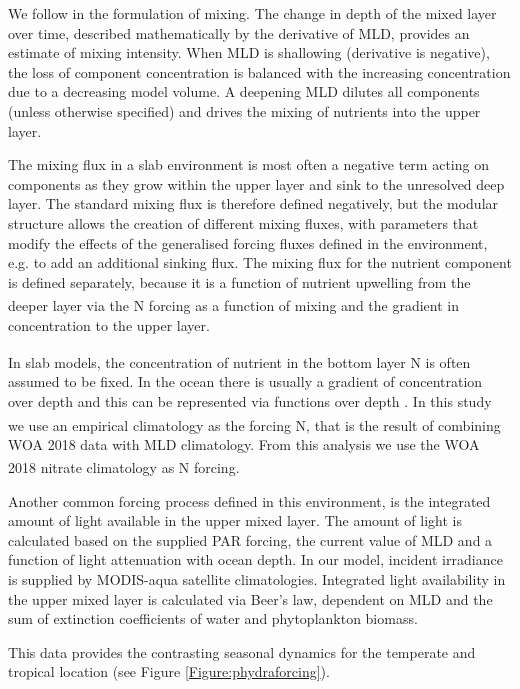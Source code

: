 \documentclass[journal abbreviations, manuscript]{copernicus}
\begin{document}
We follow \citet{Evans1985ACycles} in the formulation of mixing. The change in depth of the mixed layer over time, described mathematically by the derivative of MLD, provides an estimate of mixing intensity. When MLD is shallowing (derivative is negative), the loss of component concentration is balanced with the increasing concentration due to a decreasing model volume. A deepening MLD dilutes all components (unless otherwise specified) and drives the mixing of nutrients into the upper layer.

The mixing flux in a slab environment is most often a negative term acting on components as they grow within the upper layer and sink to the unresolved deep layer. The standard mixing flux is therefore defined negatively, but the modular structure allows the creation of different mixing fluxes, with parameters that modify the effects of the generalised forcing fluxes defined in the environment, e.g. to add an additional sinking flux. The mixing flux for the nutrient component is defined separately, because it is a function of nutrient upwelling from the deeper layer via the \unit{N^\emptyset} forcing as a function of mixing and the gradient in concentration to the upper layer.

In slab models, the concentration of nutrient in the bottom layer \unit{N^\emptyset} is often assumed to be fixed. In the ocean there is usually a gradient of concentration over depth and this can be represented via functions over depth \citep{Frost1987GrazingSpp., Fasham1995VariationsAnalysis}. In this study we use an empirical climatology as the forcing \unit{N^\emptyset}, that is the result of combining WOA 2018 data with MLD climatology. From this analysis we use the WOA 2018 nitrate climatology as \unit{N^\emptyset} forcing.

Another common forcing process defined in this environment, is the integrated amount of light available in the upper mixed layer. The amount of light is calculated based on the supplied PAR forcing, the current value of MLD and a function of light attenuation with ocean depth. In our model, incident irradiance is supplied by MODIS-aqua satellite climatologies. Integrated light availability in the upper mixed layer is calculated via Beer's law, dependent on MLD and the sum of extinction coefficients of water and phytoplankton biomass. 

This data provides the contrasting seasonal dynamics for the temperate and tropical location (see Figure \ref{Figure:phydraforcing}).
\end{document}
